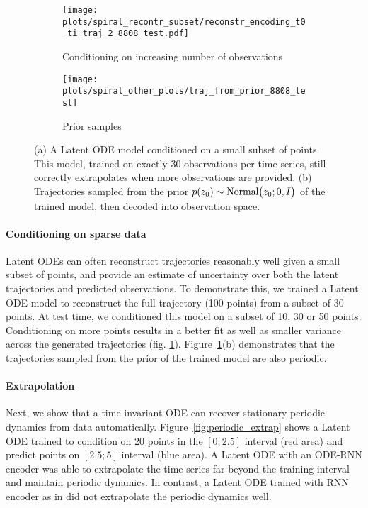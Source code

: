 \documentclass{article}
\begin{document}
\begin{figure}[b]
	\centering
\hspace{0cm}\begin{subfigure}[b]{0.70\columnwidth}
	\centering
	\texttt{[image: plots/spiral\_recontr\_subset/reconstr\_encoding\_t0\_ti\_traj\_2\_8808\_test.pdf]}
	\caption{Conditioning on increasing number of observations}
	\end{subfigure}
\begin{subfigure}[b]{0.29\columnwidth}
	\centering
	\vspace{8mm}
	\texttt{[image: plots/spiral\_other\_plots/traj\_from\_prior\_8808\_test]}
	\caption{Prior samples}
	\end{subfigure}
\caption{(a) A Latent ODE model conditioned on a small subset of points. 
	This model, trained on exactly 30 observations per time series, still correctly extrapolates when more observations are provided.
	(b) Trajectories sampled from the prior $p(z_0) \sim \textnormal{Normal}\big(z_0; 0, I\big)$ of the trained model, then decoded into observation space.}
	\label{fig:cond_on_subset}
\end{figure}

\paragraph{Conditioning on sparse data}
Latent ODEs can often reconstruct trajectories reasonably well given a small subset of points, and provide an estimate of uncertainty over both the latent trajectories and predicted observations.
To demonstrate this, we trained a Latent ODE model to reconstruct the full trajectory (100 points) from a subset of 30 points.
At test time, we conditioned this model on a subset of 10, 30 or 50 points.
Conditioning on more points results in a better fit as well as smaller variance across the generated trajectories (fig. \ref{fig:cond_on_subset}).
Figure~\ref{fig:cond_on_subset}(b) demonstrates that the trajectories sampled from the prior of the trained model are also periodic.







\paragraph{Extrapolation}
Next, we show that a time-invariant ODE can recover stationary periodic dynamics from data automatically.
Figure~\ref{fig:periodic_extrap} shows a Latent ODE trained to condition on 20 points in the $[0; 2.5]$ interval (red area) and predict points on $[2.5; 5]$ interval (blue area).
A Latent ODE with an ODE-RNN encoder was able to extrapolate the time series far beyond the training interval and maintain periodic dynamics.
In contrast, a Latent ODE trained with RNN encoder as in \citet{NeuralODE} did not extrapolate the periodic dynamics well.
\end{document}
